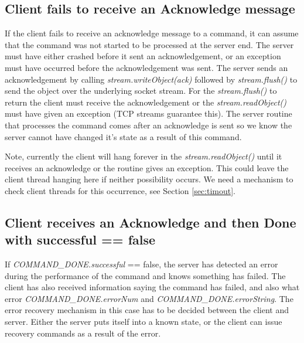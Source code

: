 \documentclass[10pt,a4paper]{article}
\begin{document}
\subsection{Client fails to receive an Acknowledge message}
If the client fails to receive an acknowledge message to a command, it can assume that the command was not
started to be processed at the server end. The server must have either crashed before it sent an
acknowledgement, or an exception must have occurred before the acknowledgement was sent. The server sends an
acknowledgement by calling {\em stream.writeObject(ack)} followed by {\em stream.flush()} to send the object over
the underlying socket stream. For the {\em stream.flush()} to return the client must receive the acknowledgement
or the {\em stream.readObject()} must have given an exception (TCP streams guarantee this). 
The server routine that processes the command comes after an acknowledge is sent so
we know the server cannot have changed it's state as a result of this command. 

Note, currently the client will hang forever in the {\em stream.readObject()} until it receives an acknowledge
or the routine gives an exception. This could leave the client thread hanging here if neither possibility occurs.
We need a mechanism to check client threads for this occurrence, see Section \ref{sec:timout}.

\subsection{Client receives an Acknowledge and then Done with successful == false}
If {\em COMMAND\_DONE.successful} == false, the server has detected an error during the performance of the 
command and knows
something has failed. The client has also received information saying the command has failed, and also
what error {\em COMMAND\_DONE.errorNum} and {\em COMMAND\_DONE.errorString}. The error
recovery mechanism in this case has to be decided between the client and server. Either the server puts itself
into a known state, or the client can issue recovery commands as a result of the error. 
\end{document}
